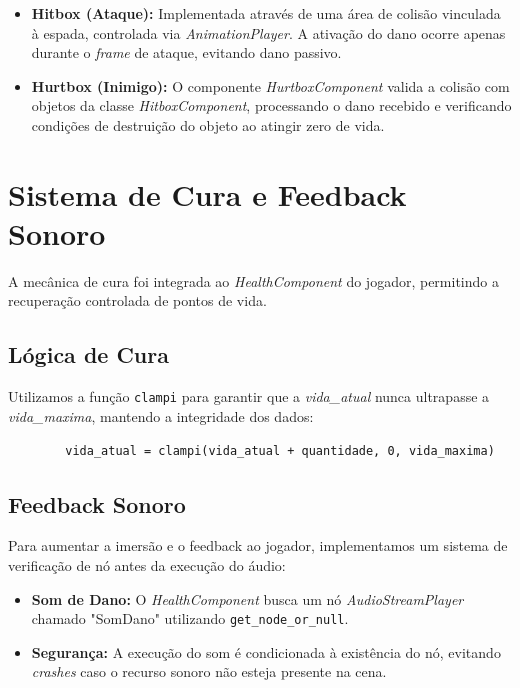 \documentclass[12pt, a4paper]{article} %
\begin{document}
	\begin{itemize}
		\item \textbf{Hitbox (Ataque):} Implementada através de uma área de colisão vinculada à espada, controlada via \textit{AnimationPlayer}. A ativação do dano ocorre apenas durante o \textit{frame} de ataque, evitando dano passivo.
		\item \textbf{Hurtbox (Inimigo):} O componente \textit{HurtboxComponent} valida a colisão com objetos da classe \textit{HitboxComponent}, processando o dano recebido e verificando condições de destruição do objeto ao atingir zero de vida.
	\end{itemize}
	
	\section{Sistema de Cura e Feedback Sonoro}
	A mecânica de cura foi integrada ao \textit{HealthComponent} do jogador, permitindo a recuperação controlada de pontos de vida.
	
	\subsection{Lógica de Cura}
	Utilizamos a função \texttt{clampi} para garantir que a \textit{vida\_atual} nunca ultrapasse a \textit{vida\_maxima}, mantendo a integridade dos dados:
	\begin{verbatim}
		vida_atual = clampi(vida_atual + quantidade, 0, vida_maxima)
	\end{verbatim}
	
	\subsection{Feedback Sonoro}
	Para aumentar a imersão e o feedback ao jogador, implementamos um sistema de verificação de nó antes da execução do áudio:
	\begin{itemize}
		\item \textbf{Som de Dano:} O \textit{HealthComponent} busca um nó \textit{AudioStreamPlayer} chamado "SomDano" utilizando \texttt{get\_node\_or\_null}.
		\item \textbf{Segurança:} A execução do som é condicionada à existência do nó, evitando \textit{crashes} caso o recurso sonoro não esteja presente na cena.
	\end{itemize}
	
	
\end{document}
